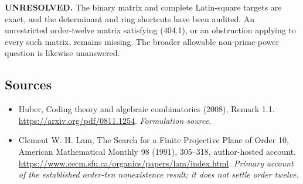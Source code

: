 \documentclass[11pt]{article}
\begin{document}
\textbf{UNRESOLVED.} The binary matrix and complete Latin-square targets are exact, and the determinant and ring shortcuts have been audited. An unrestricted order-twelve matrix satisfying (404.1), or an obstruction applying to every such matrix, remains missing. The broader allowable non-prime-power question is likewise unanswered.

\subsection{Sources}
\begin{itemize}
\item[S1]Huber, Coding theory and algebraic combinatorics (2008), Remark 1.1.
\url{https://arxiv.org/pdf/0811.1254}.
\textit{Formulation source.}
\item[E1]Clement W. H. Lam, The Search for a Finite Projective Plane of Order 10, American Mathematical Monthly 98 (1991), 305--318, author-hosted account.
\url{https://www.cecm.sfu.ca/organics/papers/lam/index.html}.
\textit{Primary account of the established order-ten nonexistence result; it does not settle order twelve.}
\end{itemize}
\end{document}
